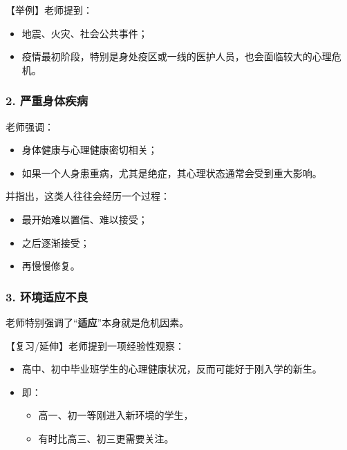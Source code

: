 \documentclass[
  chinese,
  9pt,
  a4paper,
]{ctexart}
\providecommand{\tightlist}{%
  \setlength{\itemsep}{0pt}\setlength{\parskip}{0pt}}
\begin{document}
【举例】老师提到：

\begin{itemize}
\tightlist
\item
  地震、火灾、社会公共事件；
\item
  疫情最初阶段，特别是身处疫区或一线的医护人员，也会面临较大的心理危机。
\end{itemize}

\subsubsection{2.
严重身体疾病}\label{ux4e25ux91cdux8eabux4f53ux75beux75c5}

老师强调：

\begin{itemize}
\tightlist
\item
  身体健康与心理健康密切相关；
\item
  如果一个人身患重病，尤其是绝症，其心理状态通常会受到重大影响。
\end{itemize}

并指出，这类人往往会经历一个过程：

\begin{itemize}
\tightlist
\item
  最开始难以置信、难以接受；
\item
  之后逐渐接受；
\item
  再慢慢修复。
\end{itemize}

\subsubsection{3.
环境适应不良}\label{ux73afux5883ux9002ux5e94ux4e0dux826f}

老师特别强调了``\textbf{适应}''本身就是危机因素。

【复习/延伸】老师提到一项经验性观察：

\begin{itemize}
\item
  高中、初中毕业班学生的心理健康状况，反而可能好于刚入学的新生。
\item
  即：

  \begin{itemize}
  \tightlist
  \item
    高一、初一等刚进入新环境的学生，
  \item
    有时比高三、初三更需要关注。
  \end{itemize}
\end{itemize}
\end{document}
